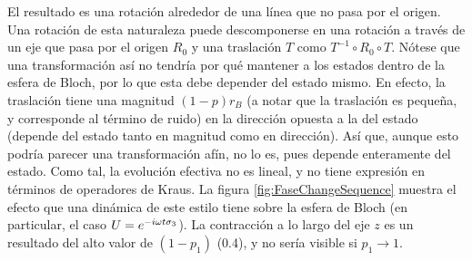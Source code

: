 El resultado es una rotación alrededor de una línea que no pasa por el origen. Una rotación de esta naturaleza puede descomponerse en una rotación a través de un eje que pasa por el origen $R_{0}$ y una traslación $T$ como $T^{-1}\circ R_{0}\circ T$. Nótese que una transformación así no tendría por qué mantener a los estados dentro de la esfera de Bloch, por lo que esta debe depender del estado mismo. En efecto, la traslación tiene una magnitud $(1-p)r_{B}$ (a notar que la traslación es pequeña, y corresponde al término de ruido) en la dirección opuesta a la del estado (depende del estado tanto en magnitud como en dirección). Así que, aunque esto podría parecer una transformación afín, no lo es, pues depende enteramente del estado. Como tal, la evolución efectiva no es lineal, y no tiene expresión en términos de operadores de Kraus. La figura \ref{fig:FaseChangeSequence} muestra el efecto que una dinámica de este estilo tiene sobre la esfera de Bloch (en particular, el caso $U=e^{-i\omega t \sigma_{3}}$). La contracción a lo largo del eje $z$ es un resultado del alto valor de $(1-p_{1})$ (0.4), y no sería visible si $p_{1}\rightarrow 1$.

